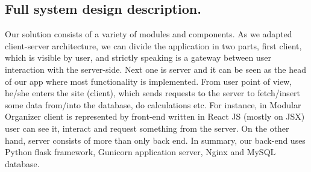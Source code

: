 \subsection{Full system design description. }
	\par Our solution consists of a variety of modules and components. As we adapted client-server architecture, we can divide the application in two parts, first client, which is visible by user, and strictly speaking is a gateway between user interaction with the server-side. Next one is server and it can be seen as the head of our app where most functionality is implemented. From user point of view, he/she enters the site (client), which sends requests to the server to fetch/insert some data from/into the database, do calculations etc. For instance, in Modular Organizer client is represented by front-end written in React JS (mostly on JSX) user can see it, interact and request something from the server. On the other hand, server consists of more than only back end. In summary, our back-end uses Python flask framework, Gunicorn application server,  Nginx and MySQL database.  
	
